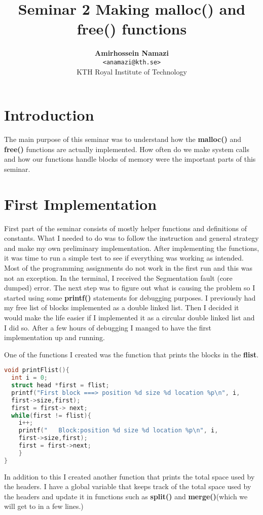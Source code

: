 \documentclass[a4paper,10pt]{article}
\title{\vspace{-1.5em}\textbf{Seminar 2 Making malloc() and free() functions}}
\author{{\textbf{Amirhossein Namazi}} \\
        {\texttt{<anamazi@kth.se>}} \\
        {KTH Royal Institute of Technology}}
\begin{document}
\maketitle

\section*{Introduction}
The main purpose of this seminar was to understand how the \textbf{malloc()} and \textbf{free()} functions are actually implemented. How often do we make system calls and how our functions handle blocks of memory were the important parts of this seminar.
\section*{First Implementation}
First part of the seminar consists of mostly helper functions and definitions of constants. What I needed to do was to follow the instruction and general strategy and make my own preliminary implementation. After implementing the functions, it was time to run a simple test to see if everything was working as intended. Most of the programming assignments do not work in the first run and this was not an exception. In the terminal, I received the Segmentation fault
(core dumped) error. The next step was to figure out what is causing the problem so I started using some \textbf{printf()} statements for debugging purposes. I previously had my free list of blocks implemented as a double linked list. Then I decided it would make the life easier if I implemented it as a circular double linked list and I did so. After a few hours of debugging I manged to have the first implementation up and running.

One of the functions I created was the function that prints the blocks in the \textbf{flist}.
\vspace{5mm}
\begin{lstlisting}[language=C]
void printFlist(){
  int i = 0;
  struct head *first = flist;
  printf("First block ===> position %d size %d location %p\n", i,
  first->size,first);
  first = first-> next;
  while(first != flist){
    i++;
    printf("   Block:position %d size %d location %p\n", i,
    first->size,first);
    first = first->next;
    }
}

\end{lstlisting}
\vspace{5mm}

In addition to this I created another function that prints the total space used by the headers. I have a global variable that keeps track of the total space used by the headers and update it in functions such as \textbf{split()} and \textbf{merge()}(which we will get to in a few lines.)
\end{document}
